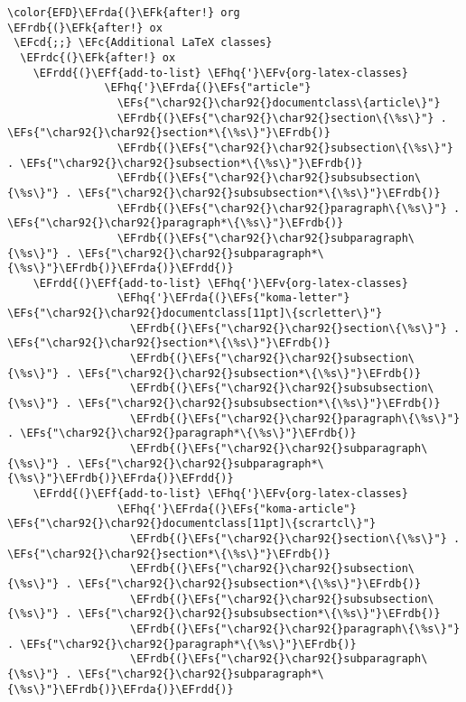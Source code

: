 \documentclass{article}
\newcommand{\EFc}[1]{\textcolor{EFc}{#1}} %
\newcommand{\EFcd}[1]{\textcolor{EFcd}{#1}} %
\newcommand{\EFs}[1]{\textcolor{EFs}{#1}} %
\newcommand{\EFk}[1]{\textcolor{EFk}{#1}} %
\newcommand{\EFf}[1]{\textcolor{EFf}{#1}} %
\newcommand{\EFv}[1]{\textcolor{EFv}{#1}} %
\newcommand{\EFhq}[1]{#1} %
\newcommand{\EFrda}[1]{\textcolor{EFrda}{#1}} %
\newcommand{\EFrdb}[1]{\textcolor{EFrdb}{#1}} %
\newcommand{\EFrdc}[1]{\textcolor{EFrdc}{#1}} %
\newcommand{\EFrdd}[1]{\textcolor{EFrdd}{#1}} %
\begin{document}
\begin{Code}
\begin{Verbatim}
\color{EFD}\EFrda{(}\EFk{after!} org
\EFrdb{(}\EFk{after!} ox
 \EFcd{;;} \EFc{Additional LaTeX classes}
  \EFrdc{(}\EFk{after!} ox
    \EFrdd{(}\EFf{add-to-list} \EFhq{'}\EFv{org-latex-classes}
               \EFhq{'}\EFrda{(}\EFs{"article"}
                 \EFs{"\char92{}\char92{}documentclass\{article\}"}
                 \EFrdb{(}\EFs{"\char92{}\char92{}section\{\%s\}"} . \EFs{"\char92{}\char92{}section*\{\%s\}"}\EFrdb{)}
                 \EFrdb{(}\EFs{"\char92{}\char92{}subsection\{\%s\}"} . \EFs{"\char92{}\char92{}subsection*\{\%s\}"}\EFrdb{)}
                 \EFrdb{(}\EFs{"\char92{}\char92{}subsubsection\{\%s\}"} . \EFs{"\char92{}\char92{}subsubsection*\{\%s\}"}\EFrdb{)}
                 \EFrdb{(}\EFs{"\char92{}\char92{}paragraph\{\%s\}"} . \EFs{"\char92{}\char92{}paragraph*\{\%s\}"}\EFrdb{)}
                 \EFrdb{(}\EFs{"\char92{}\char92{}subparagraph\{\%s\}"} . \EFs{"\char92{}\char92{}subparagraph*\{\%s\}"}\EFrdb{)}\EFrda{)}\EFrdd{)}
    \EFrdd{(}\EFf{add-to-list} \EFhq{'}\EFv{org-latex-classes}
                 \EFhq{'}\EFrda{(}\EFs{"koma-letter"} \EFs{"\char92{}\char92{}documentclass[11pt]\{scrletter\}"}
                   \EFrdb{(}\EFs{"\char92{}\char92{}section\{\%s\}"} . \EFs{"\char92{}\char92{}section*\{\%s\}"}\EFrdb{)}
                   \EFrdb{(}\EFs{"\char92{}\char92{}subsection\{\%s\}"} . \EFs{"\char92{}\char92{}subsection*\{\%s\}"}\EFrdb{)}
                   \EFrdb{(}\EFs{"\char92{}\char92{}subsubsection\{\%s\}"} . \EFs{"\char92{}\char92{}subsubsection*\{\%s\}"}\EFrdb{)}
                   \EFrdb{(}\EFs{"\char92{}\char92{}paragraph\{\%s\}"} . \EFs{"\char92{}\char92{}paragraph*\{\%s\}"}\EFrdb{)}
                   \EFrdb{(}\EFs{"\char92{}\char92{}subparagraph\{\%s\}"} . \EFs{"\char92{}\char92{}subparagraph*\{\%s\}"}\EFrdb{)}\EFrda{)}\EFrdd{)}
    \EFrdd{(}\EFf{add-to-list} \EFhq{'}\EFv{org-latex-classes}
                 \EFhq{'}\EFrda{(}\EFs{"koma-article"} \EFs{"\char92{}\char92{}documentclass[11pt]\{scrartcl\}"}
                   \EFrdb{(}\EFs{"\char92{}\char92{}section\{\%s\}"} . \EFs{"\char92{}\char92{}section*\{\%s\}"}\EFrdb{)}
                   \EFrdb{(}\EFs{"\char92{}\char92{}subsection\{\%s\}"} . \EFs{"\char92{}\char92{}subsection*\{\%s\}"}\EFrdb{)}
                   \EFrdb{(}\EFs{"\char92{}\char92{}subsubsection\{\%s\}"} . \EFs{"\char92{}\char92{}subsubsection*\{\%s\}"}\EFrdb{)}
                   \EFrdb{(}\EFs{"\char92{}\char92{}paragraph\{\%s\}"} . \EFs{"\char92{}\char92{}paragraph*\{\%s\}"}\EFrdb{)}
                   \EFrdb{(}\EFs{"\char92{}\char92{}subparagraph\{\%s\}"} . \EFs{"\char92{}\char92{}subparagraph*\{\%s\}"}\EFrdb{)}\EFrda{)}\EFrdd{)}

\end{Verbatim}
\end{Code}
\end{document}
